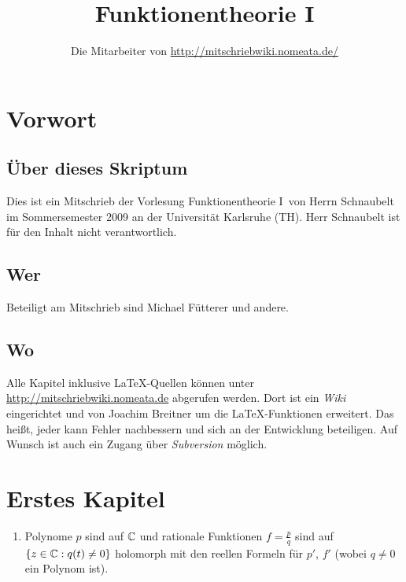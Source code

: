 \documentclass[a4paper,twoside,DIV15,BCOR12mm]{scrbook}
\author{Die Mitarbeiter von \url{http://mitschriebwiki.nomeata.de/}}
\title{Funktionentheorie I}
\begin{document}
\maketitle

\renewcommand{\thechapter}{\Roman{chapter}}
\tableofcontents

\chapter{Vorwort}

\section{Über dieses Skriptum}
Dies ist ein Mitschrieb der Vorlesung \glqq Funktionentheorie I\grqq\ von Herrn Schnaubelt im
Sommersemester 2009 an der Universität Karlsruhe (TH).
Herr Schnaubelt ist für den Inhalt nicht verantwortlich.

\section{Wer}
Beteiligt am Mitschrieb sind Michael Fütterer und andere.

\section{Wo}
Alle Kapitel inklusive \LaTeX-Quellen können unter \url{http://mitschriebwiki.nomeata.de} abgerufen werden.
Dort ist ein \emph{Wiki} eingerichtet und von Joachim Breitner um die \LaTeX-Funktionen erweitert.
Das heißt, jeder kann Fehler nachbessern und sich an der Entwicklung
beteiligen. Auf Wunsch ist auch ein Zugang über \emph{Subversion} möglich.

\setcounter{chapter}{0}

\chapter{Erstes Kapitel}

\begin{bsp}
\begin{enumerate}
\item Polynome $p$ sind auf $\mathbb{C}$ und rationale Funktionen $f = \frac{p}{q}$ sind auf $\{z\in\mathbb{C}: q(t) \neq 0\}$ holomorph mit den reellen Formeln für $p'$, $f'$ (wobei $q \neq 0$ ein Polynom ist).
\end{enumerate}
\end{bsp}
\end{document}
